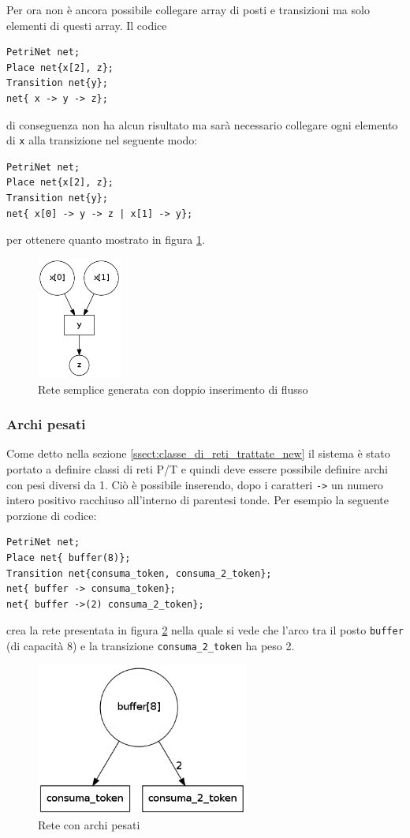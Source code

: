 \documentclass[italian,12pt]{book}
\begin{document}
Per ora non è ancora possibile collegare array di posti e transizioni ma solo elementi di questi array.
Il codice 
\begin{verbatim}PetriNet net;
Place net{x[2], z};
Transition net{y};
net{ x -> y -> z};
\end{verbatim}
di conseguenza non ha alcun risultato ma sarà necessario collegare ogni elemento di {\tt x} alla transizione
nel seguente modo:
\begin{verbatim}PetriNet net;
Place net{x[2], z};
Transition net{y};
net{ x[0] -> y -> z | x[1] -> y};
\end{verbatim}
per ottenere quanto mostrato in figura \ref{fig:flussi2.png}.

\begin{figure}[htb]
\centerline{\includegraphics[height=4cm]{img/flussi2.png}}
\caption{Rete semplice generata con doppio inserimento di flusso}\label{fig:flussi2.png}
\end{figure}

\subsubsection{Archi pesati}
Come detto nella sezione \ref{ssect:classe_di_reti_trattate_new} il sistema è stato portato a definire 
classi di reti P/T e quindi deve essere possibile definire archi con pesi diversi da 1. 
Ciò è possibile inserendo, dopo
i caratteri {\tt ->} un numero intero positivo racchiuso all'interno di parentesi tonde. Per esempio la seguente
porzione di codice:
\begin{verbatim}PetriNet net;
Place net{ buffer(8)};
Transition net{consuma_token, consuma_2_token};
net{ buffer -> consuma_token};
net{ buffer ->(2) consuma_2_token};
\end{verbatim}
crea la rete presentata in figura \ref{fig:flussi3.png} nella quale si vede che l'arco tra il posto {\tt buffer}
(di capacità 8) e la transizione {\tt consuma\_2\_token} ha peso 2.

\begin{figure}[htb]
\centerline{\includegraphics[height=5cm]{img/flussi3.png}}
\caption{Rete con archi pesati}\label{fig:flussi3.png}
\end{figure}
\end{document}
